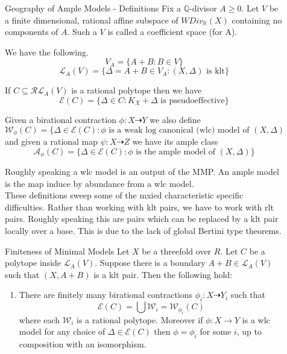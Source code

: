 \documentclass[final]{beamer}
\newlength{\sepwidth}
\newcommand{\separatorcolumn}{\begin{column}{\sepwidth}\end{column}}
\begin{document}
\begin{frame}[t, fragile]
\begin{columns}[t]
\begin{column}{0.39\paperwidth}
			
			
		\end{column}
		
		\separatorcolumn
		
		\begin{column}{0.44\paperwidth}
			
			\begin{block}{Geography of Ample Models - Definitions}
				Fix a $\mathbb{Q}$-divisor $A\geq 0$. Let $V$ be a finite dimensional, rational affine subspace of $WDiv_{\mathbb{R}}(X)$ containing no components of $A$. Such a $V$ is called a coefficient space (for A).
				
				We have the following.
				\[V_{A}= \{A+B: B \in V\}\]
				\[\mathcal{L}_{A}(V)=\{\Delta=A+B \in V_{A}: (X,\Delta) \text{ is klt}\}\]
				
				If $C \subseteq \mathcal{RL}_{A}(V)$ is a rational polytope then we have
				\[\mathcal{E}(C)=\{\Delta \in C: K_{X}+\Delta \text{ is pseudoeffective}\}\]
				
				Given a birational contraction $\phi:X \dashrightarrow Y$ we also define
				\[\mathcal{W}_{\phi}(C)=\{\Delta \in \mathcal{E}(C): \phi \text{ is a weak log canonical (wlc) model of } (X,\Delta)\}\]
				and given a rational map $\psi:X \dashrightarrow Z$ we have its ample class
				\[\mathcal{A}_{\phi}(C)=\{\Delta \in \mathcal{E}(C): \phi \text{ is the ample model of } (X,\Delta)\}\]
				
				Roughly speaking a wlc model is an output of the MMP. An ample model is the map induce by abundance from a wlc model.\\
				\hfill \break
				These definitions sweep some of the mxied characteristic specific difficulties. Rather than working with klt pairs, we have to work with rlt pairs. Roughly speaking this are pairs which can be replaced by a klt pair locally over a base. This is due to the lack of global Bertini type theorems.
				
			\end{block}
			
			\begin{alertblock}{Finiteness of Minimal Models}
				Let $X$ be a threefold over $R$. Let $C$ be a polytope inside $\mathcal{L}_{A}(V)$. Suppose there is a boundary $A+B \in \mathcal{L}_{A}(V)$ such that $(X,A+B)$ is a klt pair. Then the following hold:
				
				\begin{enumerate}
					\item There are finitely many birational contractions $\phi_{i}:X \dashrightarrow Y_{i}$ such that 
					\[\mathcal{E}(C) = \bigcup \mathcal{W}_{i}=\mathcal{W}_{\phi_{i}}(C)\]
					where each $\mathcal{W}_{i}$ is a rational polytope. Moreover if $\phi:X \to Y$ is a wlc model for any choice of $\Delta \in \mathcal{E}(C)$ then $\phi=\phi_{i}$ for some $i$, up to composition with an isomorphism.
					

\end{enumerate}
\end{alertblock}
\end{column}
\end{columns}
\end{frame}
\end{document}
